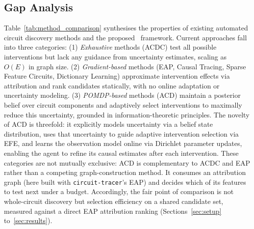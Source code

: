 \subsection{Gap Analysis}

Table~\ref{tab:method_comparison} synthesises the properties of existing automated
circuit discovery methods and the proposed \ACD\ framework. Current approaches fall
into three categories: (1) \emph{Exhaustive} methods (ACDC) test all possible
interventions but lack any guidance from uncertainty estimates, scaling as $O(E)$ in
graph size. (2) \emph{Gradient-based} methods (EAP, Causal Tracing, Sparse Feature
Circuits, Dictionary Learning) approximate intervention effects via attribution and
rank candidates statically, with no online adaptation or uncertainty modeling. (3)
\emph{POMDP-based} methods (ACD) maintain a posterior belief over circuit components
and adaptively select interventions to maximally reduce this uncertainty, grounded in
information-theoretic principles. The novelty of ACD is threefold: it explicitly
models uncertainty via a belief state distribution, uses that uncertainty to guide
adaptive intervention selection via EFE, and learns the observation model online via
Dirichlet parameter updates, enabling the agent to refine its causal estimates after
each intervention. These categories are not mutually exclusive: ACD is
complementary to ACDC and EAP rather than a competing graph-construction
method. It consumes an attribution graph (here built with \texttt{circuit-tracer}'s
EAP) and decides which of its features to test next under a budget. Accordingly, the
fair point of comparison is not whole-circuit discovery but selection efficiency
on a shared candidate set, measured against a direct EAP attribution ranking
(Sections~\ref{sec:setup} to~\ref{sec:results}).

\begin{table}[H]
  \centering
  \caption{Comparison of automated circuit discovery methods.}
  \label{tab:method_comparison}
  \small
\end{table}
